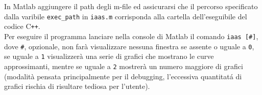 \documentclass[12pt]{report}
\begin{document}
\noindent In Matlab aggiungere il path degli m-file ed assicurarsi che il percorso specificato dalla varibile \verb|exec_path| in \verb|iaas.m| corrisponda alla cartella dell'eseguibile del codice C\verb|++|.\\
Per eseguire il programma lanciare nella console di Matlab il comando \verb|iaas [#]|, dove \verb|#|, opzionale, non far\`a visualizzare nessuna finestra se assente o uguale a \verb|0|, se uguale a \verb|1| visualizzer\`a una serie di grafici che mostrano le curve approssimanti, mentre se uguale a \verb|2| mostrer\`a un numero maggiore di grafici (modalit\`a pensata principalmente per il debugging, l'eccessiva quantitat\'a di grafici rischia di risultare tediosa per l'utente).

\end{document}
